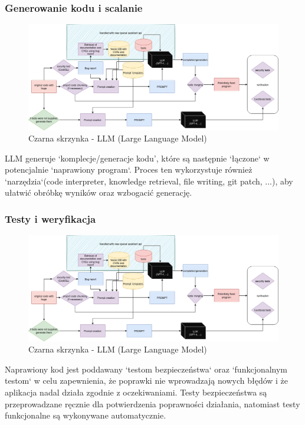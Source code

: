 \subsubsection{Generowanie kodu i scalanie}
\begin{figure}[h]
    \centering
    \includegraphics[clip, trim=12cm 6cm 6cm 0cm, width=0.9\linewidth]{img/gptester.drawio.png}
    \caption{Czarna skrzynka - LLM (Large Language Model)}
    \label{fig:przyciety_obraz}
\end{figure}
LLM generuje `komplecje/generacje kodu', które są następnie `łączone` w potencjalnie `naprawiony program`. Proces ten wykorzystuje również `narzędzia`(code interpreter, knowledge retrieval, file writing, git patch, ...), aby ułatwić obróbkę wyników oraz wzbogacić generację.

\subsubsection{Testy i weryfikacja}
\begin{figure}[h]
    \centering
    \includegraphics[clip, trim=25cm 2cm 0cm 4cm, width=0.9\linewidth]{img/gptester.drawio.png}
    \caption{Czarna skrzynka - LLM (Large Language Model)}
    \label{fig:przyciety_obraz}
\end{figure}
Naprawiony kod jest poddawany `testom bezpieczeństwa` oraz `funkcjonalnym testom` w celu zapewnienia, że poprawki nie wprowadzają nowych błędów i że aplikacja nadal działa zgodnie z oczekiwaniami.
Testy bezpieczeństwa są przeprowadzane ręcznie dla potwierdzenia poprawności działania, natomiast testy funkcjonalne są wykonywane automatycznie.

